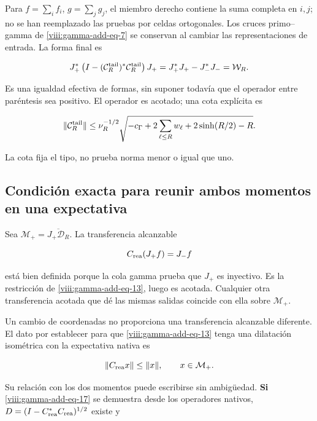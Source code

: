 Para \(f=\sum_i f_i\), \(g=\sum_j g_j\), el miembro derecho contiene la suma completa en \(i,j\); no se han reemplazado las pruebas por celdas ortogonales. Los cruces primo--gamma de \eqref{viii:gamma-add-eq-7} se conservan al cambiar las representaciones de entrada. La forma final es

\begin{equation}
J_+^*\left(I-(\mathcal C_R^{\rm tail})^*\mathcal C_R^{\rm tail}\right)J_+
=J_+^*J_+-J_-^*J_-=\mathcal W_R.
\label{viii:gamma-add-eq-16}
\end{equation}

Es una igualdad efectiva de formas, sin suponer todavía que el operador entre paréntesis sea positivo. El operador es acotado; una cota explícita es

\begin{equation}
\|\mathcal C_R^{\rm tail}\|
\le\nu_R^{-1/2}
\sqrt{-c_\Gamma+2\sum_{\ell\le R}w_\ell+2\sinh(R/2)-R}.
\label{viii:gamma-add-display-33}
\end{equation}

La cota fija el tipo, no prueba norma menor o igual que uno.

\subsection{Condición exacta para reunir ambos momentos en una expectativa}
\label{viii:gamma-add-sub-375}

Sea \(\mathcal M_+=\overline{J_+\mathcal D_R}\). La transferencia alcanzable

\begin{equation}
C_{\rm rea}(J_+f)=J_-f
\label{viii:gamma-add-display-34}
\end{equation}

está bien definida porque la cola gamma prueba que \(J_+\) es inyectivo. Es la restricción de \eqref{viii:gamma-add-eq-13}, luego es acotada. Cualquier otra transferencia acotada que dé las mismas salidas coincide con ella sobre \(\mathcal M_+\).

Un cambio de coordenadas no proporciona una transferencia alcanzable diferente. El dato por establecer para que \eqref{viii:gamma-add-eq-13} tenga una dilatación isométrica con la expectativa nativa es

\begin{equation}
\|C_{\rm rea}x\|\le\|x\|,
\qquad x\in\mathcal M_+.
\label{viii:gamma-add-eq-17}
\end{equation}

Su relación con los dos momentos puede escribirse sin ambigüedad. \textbf{Si} \eqref{viii:gamma-add-eq-17} se demuestra desde los operadores nativos, \(D=(I-C_{\rm rea}^*C_{\rm rea})^{1/2}\) existe y

